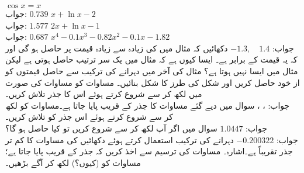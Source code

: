 \quad
$\cos x=x$\\
جواب:\quad
$0.739$
\quad
$x+\ln x-2$\\
جواب:\quad
$1.577$
\quad
$2x+\ln x-1$\\
جواب:\quad
$0.687$
\quad
$x^4-0.1x^3-0.82x^2-0.1x-1.82$\\
جواب:\quad
$-1.3,\quad 1.4$
\quad
دکھائیں کہ مثال  میں  کی زیادہ سے زیادہ قیمت   پر حاصل ہو گی اور کہ یہ قیمت  کے برابر ہے۔
\quad
ایسا کیوں ہے کہ مثال  میں یک سر ترتیب حاصل ہوتی ہے لیکن مثال  میں ایسا نہیں ہوتا ہے؟
\quad
مثال  کی آخر میں دہرانے کی ترکیب سے حاصل قیمتوں کو از خود حاصل کریں اور شکل  کی طرز کا شکل بنائیں۔ 
\quad
مساوات  کو  مساوات  کی صورت میں لکھ کر  سے شروع کرتے ہوئے اس کا جذر تلاش کریں۔\\
جواب:\quad
{}، ، 
\quad
سوال  میں دیے گئے مساوات کا جذر   کے قریب پایا جاتا ہے۔مساوات کو  لکھ کر  سے شروع کرتے ہوئے اس جذر کو تلاش کریں۔\\
جواب:\quad
$\num{1.0447}$ 
\quad
سوال  میں اگر آپ  لکھ کر  سے شروع کریں تو کیا حاصل ہو گا؟\\
جواب:\quad
$\num{-0.200322}$
\quad
دہرانے کی ترکیب استعمال کرتے ہوئے دکھائیں کی مساوات  کا کم تر جذر تقریباً  ہے۔اشارہ۔ مساوات کی ترسیم سے اخذ کریں کہ جذر 
 کے قریب پایا جاتا ہے؛ مساوات کو  (کیوں؟) لکھ کر آگے بڑھیں۔
